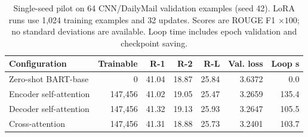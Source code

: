 \begin{table}[ht]
\centering\small
\begin{tabular}{@{}lrrrrrr@{}}
\toprule
Configuration & Trainable & R-1 & R-2 & R-L & Val. loss & Loop s \\
\midrule
Zero-shot BART-base & 0 & 41.04 & 18.87 & 25.84 & 3.6372 & 0.0 \\
Encoder self-attention & 147,456 & 41.02 & 19.05 & 25.47 & 3.2659 & 135.4 \\
Decoder self-attention & 147,456 & 41.32 & 19.13 & 25.93 & 3.2647 & 105.5 \\
Cross-attention & 147,456 & 41.31 & 18.88 & 25.73 & 3.2401 & 103.7 \\
\bottomrule
\end{tabular}
\caption{Single-seed pilot on 64 CNN/DailyMail validation examples (seed 42). LoRA runs use 1,024 training examples and 32 updates. Scores are ROUGE F1 $\times100$; no standard deviations are available. Loop time includes epoch validation and checkpoint saving.}
\label{tab:prelim_results}
\end{table}
